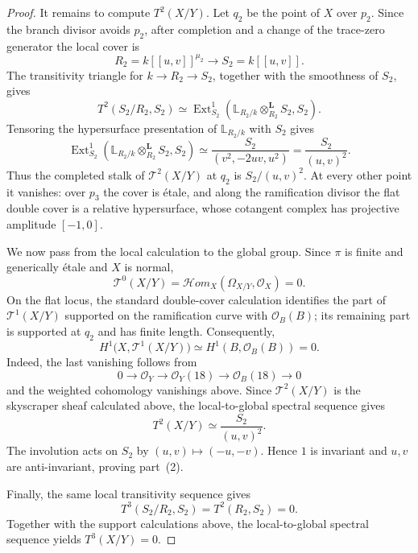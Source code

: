 \documentclass[11pt,twoside]{amsart}
\theoremstyle{plain}
\numberwithin{equation}{section}
\theoremstyle{definition}
\newcommand{\Ext}{\operatorname{Ext}}
\begin{document}
\begin{proof}
It remains to compute $T^2(X/Y)$. Let $q_2$ be the point of $X$ over
$p_2$. Since the branch divisor avoids $p_2$, after completion and a
change of the trace-zero generator the local cover is
$$
R_2=k[[u,v]]^{\mu_2}
\longrightarrow
S_2=k[[u,v]].
$$
The transitivity triangle for $k\to R_2\to S_2$, together with the
smoothness of $S_2$, gives
$$
T^2(S_2/R_2,S_2)
\simeq
\Ext^1_{S_2}
\left(
\mathbb L_{R_2/k}\otimes_{R_2}^{\mathbf L}S_2,
S_2
\right).
$$
Tensoring the hypersurface presentation of $\mathbb L_{R_2/k}$ with
$S_2$ gives
$$
\Ext^1_{S_2}
\left(
\mathbb L_{R_2/k}\otimes_{R_2}^{\mathbf L}S_2,
S_2
\right)
\simeq
\frac{S_2}{(v^2,-2uv,u^2)}
=
\frac{S_2}{(u,v)^2}.
$$
Thus the completed stalk of $\mathcal T^2(X/Y)$ at $q_2$ is
$S_2/(u,v)^2$. At every other point it vanishes: over $p_3$ the cover is
\'{e}tale, and along the ramification divisor the flat double cover is a
relative hypersurface, whose cotangent complex has projective amplitude
$[-1,0]$.

We now pass from the local calculation to the global group. Since $\pi$
is finite and generically \'{e}tale and $X$ is normal,
$$
\mathcal T^0(X/Y)
=
\mathcal H om_X(\Omega_{X/Y},\mathcal O_X)
=0.
$$
On the flat locus, the standard double-cover calculation identifies the
part of $\mathcal T^1(X/Y)$ supported on the ramification curve with
$\mathcal O_B(B)$; its remaining part is supported at $q_2$ and has
finite length. Consequently,
$$
H^1\bigl(X,\mathcal T^1(X/Y)\bigr)
\simeq
H^1(B,\mathcal O_B(B))
=0.
$$
Indeed, the last vanishing follows from
$$
0\longrightarrow\mathcal O_Y
\longrightarrow\mathcal O_Y(18)
\longrightarrow\mathcal O_B(18)
\longrightarrow0
$$
and the weighted cohomology vanishings above. Since
$\mathcal T^2(X/Y)$ is the skyscraper sheaf calculated above, the
local-to-global spectral sequence gives
$$
T^2(X/Y)
\simeq
\frac{S_2}{(u,v)^2}.
$$
The involution acts on $S_2$ by $(u,v)\mapsto(-u,-v)$. Hence $1$ is
invariant and $u,v$ are anti-invariant, proving part~\textup{(2)}.

Finally, the same local transitivity sequence gives
$$
T^3(S_2/R_2,S_2)=T^2(R_2,S_2)=0.
$$
Together with the support calculations above, the local-to-global
spectral sequence yields $T^3(X/Y)=0$.
\end{proof}
\end{document}
